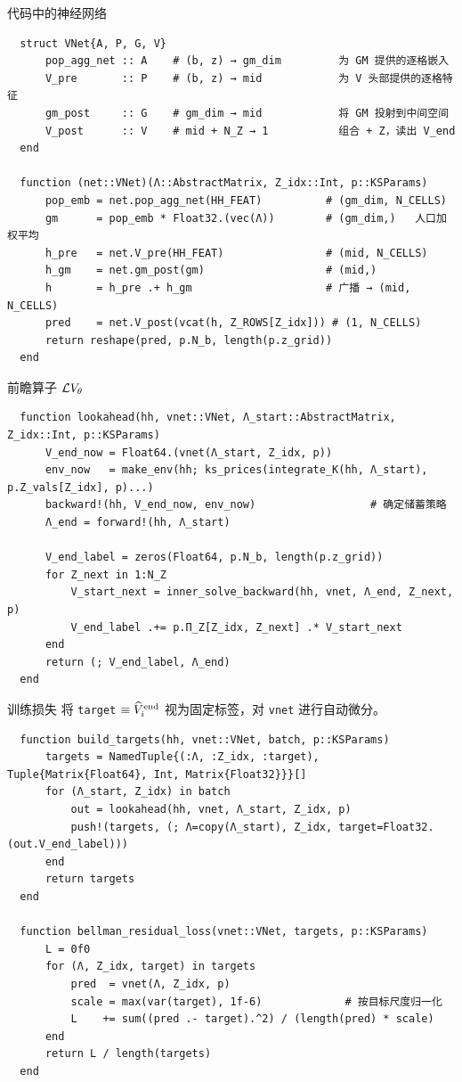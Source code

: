\documentclass[10pt,aspectratio=169]{beamer}
\begin{document}
\begin{frame}[fragile]{代码中的神经网络}
  \begin{lstlisting}
  struct VNet{A, P, G, V}
      pop_agg_net :: A    # (b, z) → gm_dim         为 GM 提供的逐格嵌入
      V_pre       :: P    # (b, z) → mid            为 V 头部提供的逐格特征
      gm_post     :: G    # gm_dim → mid            将 GM 投射到中间空间
      V_post      :: V    # mid + N_Z → 1           组合 + Z，读出 V_end
  end

  function (net::VNet)(Λ::AbstractMatrix, Z_idx::Int, p::KSParams)
      pop_emb = net.pop_agg_net(HH_FEAT)          # (gm_dim, N_CELLS)
      gm      = pop_emb * Float32.(vec(Λ))        # (gm_dim,)   人口加权平均
      h_pre   = net.V_pre(HH_FEAT)                # (mid, N_CELLS)
      h_gm    = net.gm_post(gm)                   # (mid,)
      h       = h_pre .+ h_gm                     # 广播 → (mid, N_CELLS)
      pred    = net.V_post(vcat(h, Z_ROWS[Z_idx])) # (1, N_CELLS)
      return reshape(pred, p.N_b, length(p.z_grid))
  end
  \end{lstlisting}
\end{frame}

\begin{frame}[fragile]{前瞻算子 $\mathcal{L} V_\theta$}
  \begin{lstlisting}
  function lookahead(hh, vnet::VNet, Λ_start::AbstractMatrix, Z_idx::Int, p::KSParams)
      V_end_now = Float64.(vnet(Λ_start, Z_idx, p))
      env_now   = make_env(hh; ks_prices(integrate_K(hh, Λ_start), p.Z_vals[Z_idx], p)...)
      backward!(hh, V_end_now, env_now)                  # 确定储蓄策略
      Λ_end = forward!(hh, Λ_start)

      V_end_label = zeros(Float64, p.N_b, length(p.z_grid))
      for Z_next in 1:N_Z
          V_start_next = inner_solve_backward(hh, vnet, Λ_end, Z_next, p)
          V_end_label .+= p.Π_Z[Z_idx, Z_next] .* V_start_next
      end
      return (; V_end_label, Λ_end)
  end
  \end{lstlisting}
\end{frame}

\begin{frame}[fragile]{训练损失}
  将 \texttt{target} $\equiv \widehat{V}^{\mathrm{end}}_i$ 视为固定标签，对 \texttt{vnet} 进行自动微分。

  \begin{lstlisting}
  function build_targets(hh, vnet::VNet, batch, p::KSParams)
      targets = NamedTuple{(:Λ, :Z_idx, :target), Tuple{Matrix{Float64}, Int, Matrix{Float32}}}[]
      for (Λ_start, Z_idx) in batch
          out = lookahead(hh, vnet, Λ_start, Z_idx, p)
          push!(targets, (; Λ=copy(Λ_start), Z_idx, target=Float32.(out.V_end_label)))
      end
      return targets
  end

  function bellman_residual_loss(vnet::VNet, targets, p::KSParams)
      L = 0f0
      for (Λ, Z_idx, target) in targets
          pred  = vnet(Λ, Z_idx, p)
          scale = max(var(target), 1f-6)             # 按目标尺度归一化
          L    += sum((pred .- target).^2) / (length(pred) * scale)
      end
      return L / length(targets)
  end
  \end{lstlisting}
\end{frame}
\end{document}

